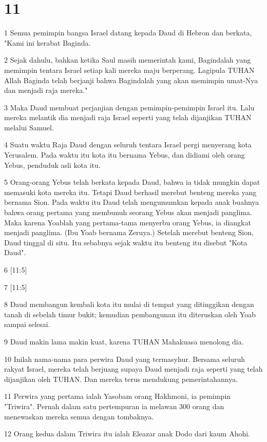 \chapter{11}

\par 1 Semua pemimpin bangsa Israel datang kepada Daud di Hebron dan berkata, "Kami ini kerabat Baginda.
\par 2 Sejak dahulu, bahkan ketika Saul masih memerintah kami, Bagindalah yang memimpin tentara Israel setiap kali mereka maju berperang. Lagipula TUHAN Allah Baginda telah berjanji bahwa Bagindalah yang akan memimpin umat-Nya dan menjadi raja mereka."
\par 3 Maka Daud membuat perjanjian dengan pemimpin-pemimpin Israel itu. Lalu mereka melantik dia menjadi raja Israel seperti yang telah dijanjikan TUHAN melalui Samuel.
\par 4 Suatu waktu Raja Daud dengan seluruh tentara Israel pergi menyerang kota Yerusalem. Pada waktu itu kota itu bernama Yebus, dan didiami oleh orang Yebus, penduduk asli kota itu.
\par 5 Orang-orang Yebus telah berkata kepada Daud, bahwa ia tidak mungkin dapat memasuki kota mereka itu. Tetapi Daud berhasil merebut benteng mereka yang bernama Sion. Pada waktu itu Daud telah mengumumkan kepada anak buahnya bahwa orang pertama yang membunuh seorang Yebus akan menjadi panglima. Maka karena Yoablah yang pertama-tama menyerbu orang Yebus, ia diangkat menjadi panglima. (Ibu Yoab bernama Zeruya.) Setelah merebut benteng Sion, Daud tinggal di situ. Itu sebabnya sejak waktu itu benteng itu disebut "Kota Daud".
\par 6 [11:5]
\par 7 [11:5]
\par 8 Daud membangun kembali kota itu mulai di tempat yang ditinggikan dengan tanah di sebelah timur bukit; kemudian pembangunan itu diteruskan oleh Yoab sampai selesai.
\par 9 Daud makin lama makin kuat, karena TUHAN Mahakuasa menolong dia.
\par 10 Inilah nama-nama para perwira Daud yang termasyhur. Bersama seluruh rakyat Israel, mereka telah berjuang supaya Daud menjadi raja seperti yang telah dijanjikan oleh TUHAN. Dan mereka terus mendukung pemerintahannya.
\par 11 Perwira yang pertama ialah Yasobam orang Hakhmoni, ia pemimpin "Triwira". Pernah dalam satu pertempuran ia melawan 300 orang dan menewaskan mereka semua dengan tombaknya.
\par 12 Orang kedua dalam Triwira itu ialah Eleazar anak Dodo dari kaum Ahohi.
